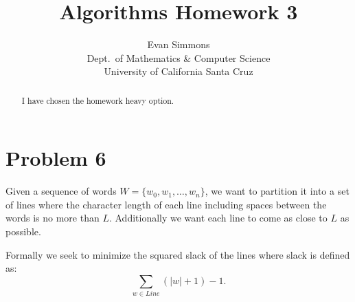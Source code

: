\documentclass{amsart}
\theoremstyle{definition}
\theoremstyle{remark}
\numberwithin{equation}{section}
\begin{document}
\title[]{Algorithms Homework 3}%
\author{Evan Simmons \\
        Dept.\ of Mathematics \& Computer Science \\ University of California Santa Cruz}%
\renewcommand{\abstractname}{Homework Option}
\begin{abstract}
I have chosen the homework heavy option.
\end{abstract}
\maketitle
\section{Problem 6}
Given a sequence of words $W = \{w_0,w_1, \ldots , w_n \}$, we want to partition it into a set of lines where the character length of each line including spaces between the words is no more than $L$. Additionally we want each line to come as close to $L$ as possible.

Formally we seek to minimize the squared slack of the lines where slack is defined as:
$$ \sum_{w \in Line} (|w|+1) -1.$$
\end{document}
